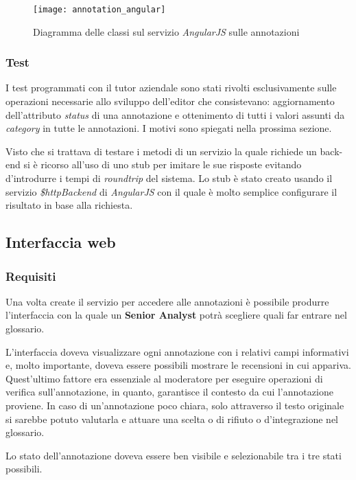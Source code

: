 \begin{figure}[H]
\begin{center}
\texttt{[image: annotation\_angular]}
\caption{
Diagramma delle classi sul servizio \textit{AngularJS} sulle annotazioni
}
\label{fig:annotation_angular}
\end{center}
\end{figure}

\subsubsection{Test}
I test programmati con il tutor aziendale sono stati rivolti esclusivamente
sulle operazioni necessarie allo sviluppo dell'editor che consistevano:
aggiornamento dell'attributo \textit{status} di una annotazione e
ottenimento di tutti i valori assunti da \textit{category} in tutte le
annotazioni. I motivi sono spiegati nella prossima sezione.

Visto che si trattava di testare i metodi di un servizio la quale richiede un
\gls{back-end} si è ricorso all'uso di uno \gls{stub} per imitare le sue
risposte evitando d'introdurre i tempi di \textit{roundtrip} del sistema.
Lo \gls{stub} è stato creato usando il servizio \textit{\$httpBackend} di
\textit{AngularJS} con il quale è molto semplice configurare il risultato in
base alla richiesta.

\subsection{Interfaccia web}
\subsubsection{Requisiti}
Una volta create il servizio per accedere alle annotazioni è possibile produrre
l'interfaccia con la quale un \textbf{Senior Analyst} potrà scegliere quali far
entrare nel glossario.

L'interfaccia doveva visualizzare ogni annotazione con i relativi campi
informativi e, molto importante, doveva essere possibili mostrare le recensioni
in cui appariva. Quest'ultimo fattore era essenziale al moderatore per eseguire
operazioni di verifica sull'annotazione, in quanto, garantisce il contesto da
cui l'annotazione proviene. In caso di un'annotazione poco chiara, solo
attraverso il testo originale si sarebbe potuto valutarla e attuare una scelta o
di rifiuto o d'integrazione nel glossario.

Lo stato dell'annotazione doveva essere ben visibile e selezionabile tra i tre
stati possibili.

